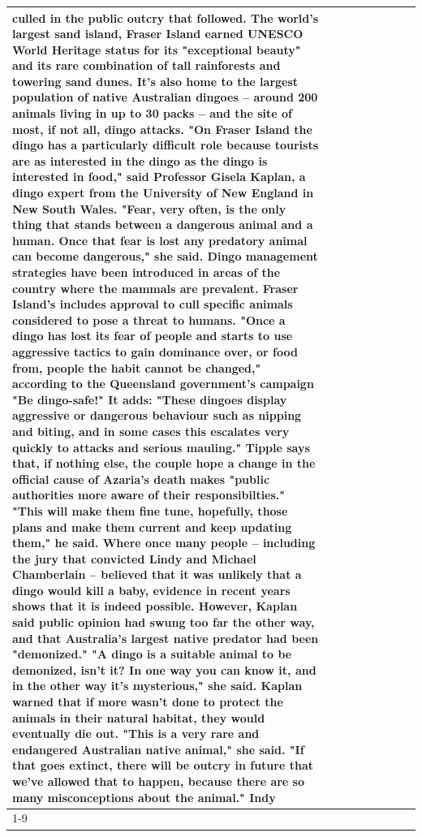 \begin{table}[H]
\begin{tabular}{lllrlllll}
culled in the public outcry that followed. The world's largest sand island, Fraser Island earned UNESCO World Heritage status for its "exceptional beauty" and its rare combination of tall rainforests and towering sand dunes. It's also home to the largest population of native Australian dingoes -- around 200 animals living in up to 30 packs -- and the site of most, if not all, dingo attacks. "On Fraser Island the dingo has a particularly difficult role because tourists are as interested in the dingo as the dingo is interested in food," said Professor Gisela Kaplan, a dingo expert from the University of New England in New South Wales. "Fear, very often, is the only thing that stands between a dangerous animal and a human. Once that fear is lost any predatory animal can become dangerous," she said. Dingo management strategies have been introduced in areas of the country where the mammals are prevalent. Fraser Island's includes approval to cull specific animals considered to pose a threat to humans. "Once a dingo has lost its fear of people and starts to use aggressive tactics to gain dominance over, or food from, people the habit cannot be changed," according to the Queensland government's campaign "Be dingo-safe!" It adds: "These dingoes display aggressive or dangerous behaviour such as nipping and biting, and in some cases this escalates very quickly to attacks and serious mauling." Tipple says that, if nothing else, the couple hope a change in the official cause of Azaria's death makes "public authorities more aware of their responsibilties." "This will make them fine tune, hopefully, those plans and make them current and keep updating them," he said. Where once many people -- including the jury that convicted Lindy and Michael Chamberlain -- believed that it was unlikely that a dingo would kill a baby, evidence in recent years shows that it is indeed possible. However, Kaplan said public opinion had swung too far the other way, and that Australia's largest native predator had been "demonized." "A dingo is a suitable animal to be demonized, isn't it? In one way you can know it, and in the other way it's mysterious," she said. Kaplan warned that if more wasn't done to protect the animals in their natural habitat, they would eventually die out. "This is a very rare and endangered Australian native animal," she said. "If that goes extinct, there will be outcry in future that we've allowed that to happen, because there are so many misconceptions about the animal." Indy \\
\cline{1-9}

\end{tabular}
\end{table}
